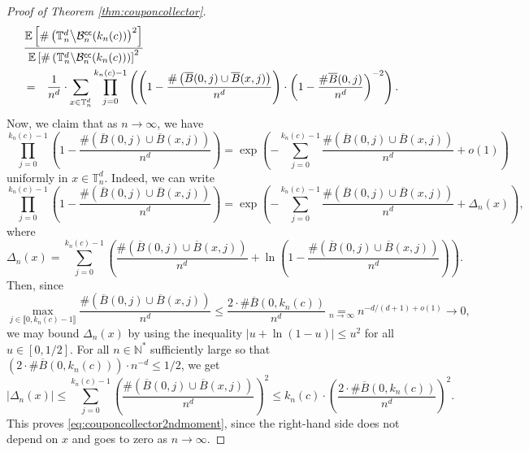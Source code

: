 \documentclass[10pt,a4paper]{amsart}
\theoremstyle{plain}
\theoremstyle{remark}
\begin{document}
\begin{proof}[Proof of Theorem \ref{thm:couponcollector}]
\begin{eqnarray*}
\lefteqn{\frac{\mathbb{E}\left[\#\left(\mathbb{T}_n^d\middle\backslash\mathcal{B}_n^\mathsf{cc}(k_n(c))\right)^2\right]}{\mathbb{E}\left[\#\left(\mathbb{T}_n^d\middle\backslash\mathcal{B}_n^\mathsf{cc}(k_n(c))\right)\right]^2}}\\
&=&\frac{1}{n^d}\cdot\sum_{x\in\mathbb{T}_n^d}\prod_{j=0}^{k_n(c)-1}\left(\left(1-\frac{\#\left(\overline{B}(0,j)\cup\overline{B}(x,j)\right)}{n^d}\right)\cdot\left(1-\frac{\#\overline{B}(0,j)}{n^d}\right)^{-2}\right).
\end{eqnarray*}
Now, we claim that as $n\to\infty$, we have
\begin{equation}\label{eq:couponcollector2ndmoment}
\prod_{j=0}^{k_n(c)-1}\left(1-\frac{\#\left(\overline{B}(0,j)\cup\overline{B}(x,j)\right)}{n^d}\right)=\exp\left(-\sum_{j=0}^{k_n(c)-1}\frac{\#\left(\overline{B}(0,j)\cup\overline{B}(x,j)\right)}{n^d}+o(1)\right)
\end{equation}
uniformly in $x\in\mathbb{T}_n^d$.
Indeed, we can write
\[\prod_{j=0}^{k_n(c)-1}\left(1-\frac{\#\left(\overline{B}(0,j)\cup\overline{B}(x,j)\right)}{n^d}\right)=\exp\left(-\sum_{j=0}^{k_n(c)-1}\frac{\#\left(\overline{B}(0,j)\cup\overline{B}(x,j)\right)}{n^d}+\Delta_n(x)\right),\]
where
\[\Delta_n(x)=\sum_{j=0}^{k_n(c)-1}\left(\frac{\#\left(\overline{B}(0,j)\cup\overline{B}(x,j)\right)}{n^d}+\ln\left(1-\frac{\#\left(\overline{B}(0,j)\cup\overline{B}(x,j)\right)}{n^d}\right)\right).\]
Then, since
\[\max_{j\in\llbracket0,k_n(c)-1\rrbracket}\frac{\#\left(\overline{B}(0,j)\cup\overline{B}(x,j)\right)}{n^d}\leq\frac{2\cdot\#\overline{B}(0,k_n(c))}{n^d}\underset{n\to\infty}{=}n^{-d/(d+1)+o(1)}\longrightarrow0,\]
we may bound $\Delta_n(x)$ by using the inequality $|u+\ln(1-u)|\leq u^2$ for all $u\in[0,1/2]$.
For all $n\in\mathbb{N}^*$ sufficiently large so that $\left(2\cdot\#\overline{B}(0,k_n(c))\right)\cdot n^{-d}\leq1/2$, we get
\[|\Delta_n(x)|\leq\sum_{j=0}^{k_n(c)-1}\left(\frac{\#\left(\overline{B}(0,j)\cup\overline{B}(x,j)\right)}{n^d}\right)^2\leq k_n(c)\cdot\left(\frac{2\cdot\#\overline{B}(0,k_n(c))}{n^d}\right)^2.\]
This proves \eqref{eq:couponcollector2ndmoment}, since the right-hand side does not depend on $x$ and goes to zero as $n\to\infty$.


\end{proof}
\end{document}
